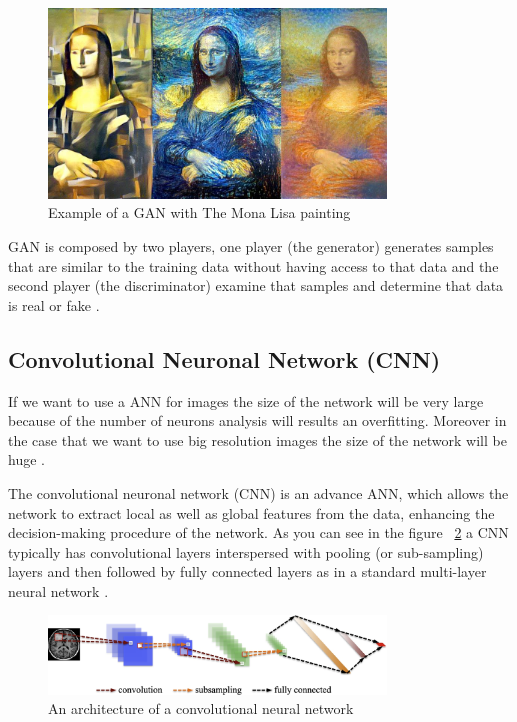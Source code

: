 \begin{figure}[H]
\centering
\includegraphics[width=0.8\textwidth]{./figures/monalisa}
\caption{Example of a GAN with The Mona Lisa painting \cite{can-art}}
\label{fig:monalisa}
\end{figure}

GAN is composed by two players, one player (the generator) generates samples that are similar to the training data without having access to that data and the second player (the discriminator) examine that samples and determine that data is real or fake \cite{can-art}.


\subsection[Convolutional Neuronal Network (CNN)]{Convolutional Neuronal Network (CNN)}


If we want to use a ANN for images the size of the network will be very large because of the number of neurons analysis will results an overfitting. Moreover in the case that we want to use big resolution images the size of the network will be huge \cite{rajalingappaa}.

The convolutional neuronal network (CNN) is an advance ANN, which allows the network to extract local as well as global features from the data, enhancing the decision-making procedure of the network\cite{abdullah}. As you can see in the figure ~\ref{fig:cnn} a CNN typically has convolutional layers interspersed with pooling (or sub-sampling) layers and then followed by fully connected layers as in a standard multi-layer neural network \cite{greenspan}.

\begin{figure}[H]
\centering
\includegraphics[width=0.8\textwidth]{./figures/cnn}
\caption{An architecture of a convolutional neural network}
\label{fig:cnn}
\end{figure}

